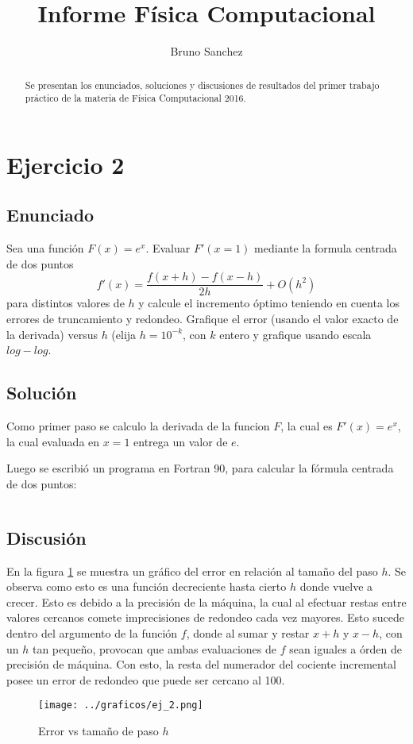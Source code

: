 \documentclass[a4paper,10pt]{paper}
\title{Informe F\'isica Computacional }
\author{Bruno Sanchez}
\begin{document}
\maketitle

\begin{abstract}
Se presentan los enunciados, soluciones y discusiones de resultados del primer trabajo pr\'actico
de la materia de F\'{i}sica Computacional 2016.
\end{abstract}

\section{Ejercicio 2}
\subsection{Enunciado}
Sea una funci\'on $F(x) = e^x$. Evaluar $F'(x=1)$ mediante la formula centrada de dos puntos 
 \begin{displaymath}
 f'(x) = \frac{f(x+h) - f(x-h)}{2h} + O(h^2)
 \end{displaymath} 
 para distintos valores de $h$ y calcule el incremento \'optimo teniendo en cuenta los errores 
 de truncamiento y redondeo. 
 Grafique el error (usando el valor exacto de la derivada) versus $h$ (elija $h=10^{-k}$, 
 con $k$ entero y grafique usando escala $log-log$.
 
\subsection{Soluci\'on}
Como primer paso se calculo la derivada de la funcion $F$, la cual es $F'(x)=e^x$, 
la cual evaluada en $x=1$ entrega un valor de $e$. 

Luego se escribi\'o un programa en Fortran 90, para calcular la f\'ormula centrada de dos puntos:
\inputminted[firstline=22]{fortran}{../2/lab1_2.f90}

\subsection{Discusi\'on}
En la figura \ref{fig:ej2} se muestra un gr\'afico del error en relaci\'on al tama\~no del paso $h$. Se observa como esto
es una funci\'on decreciente hasta cierto $h$ donde vuelve a crecer. Esto es debido a la precisi\'on de la 
m\'aquina, la cual al efectuar restas entre valores cercanos comete imprecisiones de redondeo cada vez mayores.
Esto sucede dentro del argumento de la funci\'on $f$, donde al sumar y restar $x+h$ y $x-h$, con un $h$ tan peque\~no, 
provocan que ambas evaluaciones de $f$ sean iguales a \'orden de precisi\'on de m\'aquina. Con esto, la resta del numerador
del cociente incremental posee un error de redondeo que puede ser cercano al 100\textdiscount.
\begin{figure}[H]
 \centering
 \texttt{[image: ../graficos/ej\_2.png]}
 \caption{Error vs tama\~no de paso $h$}
 \label{fig:ej2}
\end{figure}
\end{document}
